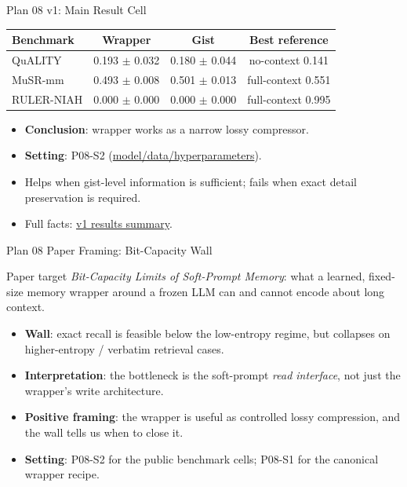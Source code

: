 \begin{frame}{Plan 08 v1: Main Result Cell}
  \small
  \begin{table}
    \centering
    \begin{tabular}{lccc}
      \toprule
      Benchmark & Wrapper & Gist & Best reference \\
      \midrule
      QuALITY & 0.193 $\pm$ 0.032 & 0.180 $\pm$ 0.044 & no-context 0.141 \\
      MuSR-mm & 0.493 $\pm$ 0.008 & 0.501 $\pm$ 0.013 & full-context 0.551 \\
      RULER-NIAH & 0.000 $\pm$ 0.000 & 0.000 $\pm$ 0.000 & full-context 0.995 \\
      \bottomrule
    \end{tabular}
  \end{table}
  \vspace{-0.3em}
  \begin{itemize}
    \item \textbf{Conclusion}: wrapper works as a narrow lossy compressor.
    \item \textbf{Setting}: P08-S2
      (\href{https://github.com/BDeMo/research-notes/blob/main/notes/plans/08-model-outputs-delta-w/settings.md\#p08-s2--v1-phase-y-three-regime-benchmark-cells}{model/data/hyperparameters}).
    \item Helps when gist-level information is sufficient; fails when exact
      detail preservation is required.
    \item Full facts:
      \href{https://github.com/BDeMo/research-notes/blob/main/notes/plans/08-model-outputs-delta-w/v1-results-2026-06-03.md}{v1 results summary}.
  \end{itemize}
\end{frame}

\begin{frame}{Plan 08 Paper Framing: Bit-Capacity Wall}
  \small
  \begin{block}{Paper target}
    \emph{Bit-Capacity Limits of Soft-Prompt Memory}: what a learned,
    fixed-size memory wrapper around a frozen LLM can and cannot encode about
    long context.
  \end{block}
  \begin{itemize}
    \item \textbf{Wall}: exact recall is feasible below the low-entropy regime,
      but collapses on higher-entropy / verbatim retrieval cases.
    \item \textbf{Interpretation}: the bottleneck is the soft-prompt
      \emph{read interface}, not just the wrapper's write architecture.
    \item \textbf{Positive framing}: the wrapper is useful as controlled lossy
      compression, and the wall tells us when to close it.
    \item \textbf{Setting}: P08-S2 for the public benchmark cells; P08-S1 for
      the canonical wrapper recipe.
  \end{itemize}
\end{frame}

